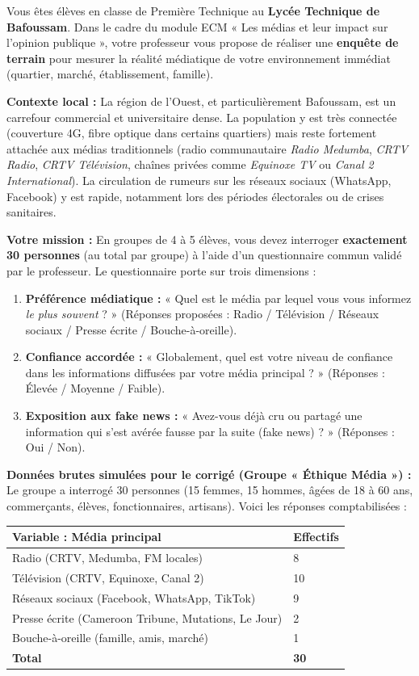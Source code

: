 \documentclass[11pt]{article}
\newcommand{\cle}[1]{{\popxbold\color{popdark}#1}}
\newcounter{popsec}
\newcounter{popsub}
\newcommand{\courssub}[1]{%
  \stepcounter{popsub}%
  \par\vspace{9pt}\noindent{\popxbold\fontsize{11.5}{13}\selectfont\color{popink}{\color{poporange}\thepopsec.\thepopsub}\hspace{6pt}#1}\par\nopagebreak\vspace{4pt}
}
\begin{document}
\courssub{Situation}
Vous êtes élèves en classe de Première Technique au \textbf{Lycée Technique de Bafoussam}. Dans le cadre du module ECM « Les médias et leur impact sur l'opinion publique », votre professeur vous propose de réaliser une \textbf{enquête de terrain} pour mesurer la réalité médiatique de votre environnement immédiat (quartier, marché, établissement, famille).

\textbf{Contexte local :} La région de l'Ouest, et particulièrement Bafoussam, est un carrefour commercial et universitaire dense. La population y est très connectée (couverture 4G, fibre optique dans certains quartiers) mais reste fortement attachée aux médias traditionnels (radio communautaire \emph{Radio Medumba}, \emph{CRTV Radio}, \emph{CRTV Télévision}, chaînes privées comme \emph{Equinoxe TV} ou \emph{Canal 2 International}). La circulation de rumeurs sur les réseaux sociaux (WhatsApp, Facebook) y est rapide, notamment lors des périodes électorales ou de crises sanitaires.

\textbf{Votre mission :} En groupes de 4 à 5 élèves, vous devez interroger \textbf{exactement 30 personnes} (au total par groupe) à l'aide d'un questionnaire commun validé par le professeur. Le questionnaire porte sur trois dimensions :
\begin{enumerate}
    \item \textbf{Préférence médiatique :} « Quel est le média par lequel vous vous informez \emph{le plus souvent} ? » (Réponses proposées : Radio / Télévision / Réseaux sociaux / Presse écrite / Bouche-à-oreille).
    \item \textbf{Confiance accordée :} « Globalement, quel est votre niveau de confiance dans les informations diffusées par votre média principal ? » (Réponses : Élevée / Moyenne / Faible).
    \item \textbf{Exposition aux \cle{fake news} :} « Avez-vous déjà cru ou partagé une information qui s'est avérée fausse par la suite (fake news) ? » (Réponses : Oui / Non).
\end{enumerate}

\textbf{Données brutes simulées pour le corrigé (Groupe « Éthique Média ») :}
Le groupe a interrogé 30 personnes (15 femmes, 15 hommes, âgées de 18 à 60 ans, commerçants, élèves, fonctionnaires, artisans). Voici les réponses comptabilisées :

\begin{center}
\begin{tabularx}{\linewidth}{|l|X|}\hline
\textbf{Variable : Média principal} & \textbf{Effectifs} \\ \hline
Radio (CRTV, Medumba, FM locales) & 8 \\ \hline
Télévision (CRTV, Equinoxe, Canal 2) & 10 \\ \hline
Réseaux sociaux (Facebook, WhatsApp, TikTok) & 9 \\ \hline
Presse écrite (Cameroon Tribune, Mutations, Le Jour) & 2 \\ \hline
Bouche-à-oreille (famille, amis, marché) & 1 \\ \hline
\textbf{Total} & \textbf{30} \\ \hline
\end{tabularx}
\end{center}
\end{document}

